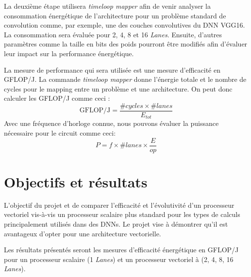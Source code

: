 \documentclass[11pt,letterpaper]{article}
\begin{document}
    La deuxième étape utilisera \textit{timeloop mapper} afin de venir analyser la consommation
    énergétique de l'architecture pour un problème standard de convolution comme, par exemple,
    une des couches convolutives du DNN VGG16. La consommation sera évaluée pour 2, 4, 8 et 16 
    \textit{Lanes}. Ensuite, d'autres paramètres comme la taille en bits des poids pourront
    être modifiés afin d'évaluer leur impact sur la performance énergétique.

    La mesure de performance qui sera utilisée est une mesure d'efficacité en GFLOP/J. La commande
    \textit{timeloop mapper} donne l'énergie totale et le nombre de cycles pour le mapping entre un problème et une architecture.
    On peut donc calculer les GFLOP/J comme ceci :
    $$\text{GFLOP/J} = \frac{\#cycles \times \#lanes}{E_{tot}}$$
    Avec une fréquence d'horloge connue, nous pouvons évaluer la puissance nécessaire pour le circuit comme ceci:
    $$P = f \times \#lanes \times \frac{E}{op}$$
\section*{Objectifs et résultats}
    L'objectif du projet et de comparer l'efficacité et l'évolutivité d'un processeur 
    vectoriel vis-à-vis un processeur scalaire plus standard pour les types de calculs
    principalement utilisés dans des DNNs. Le projet vise à démontrer qu'il est avantageux
    d'opter pour une architecture vectorielle.

    Les résultats présentés seront les mesures d'efficacité énergétique en GFLOP/J pour
    un processeur scalaire (1 \textit{Lanes}) et un processeur vectoriel à (2, 4, 8, 16 \textit{Lanes}).

{}
    
\end{document}

